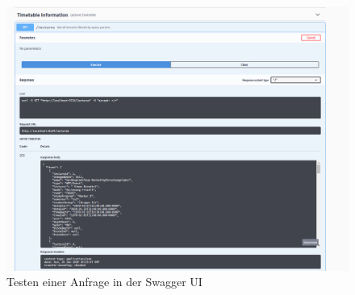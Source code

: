 \begin{figure}[H]
\centering
\includegraphics[width=14 cm]{Bilder/Kapitel_6/swagger_ui_try.png}
\caption{Testen einer Anfrage in der Swagger UI\label{fig:swagger_ui_try}}
\end{figure}